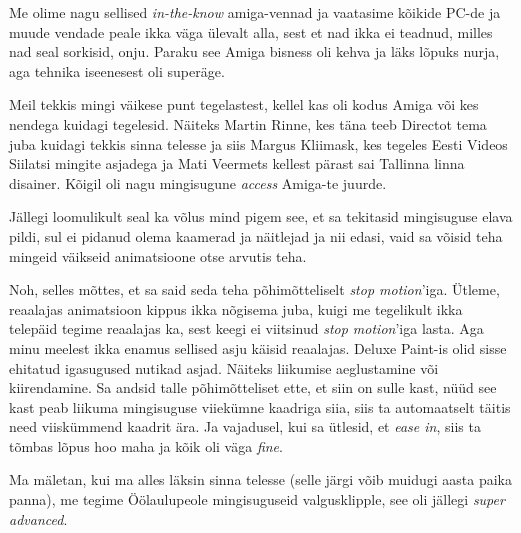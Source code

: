 Me olime nagu sellised \emph{in-the-know} amiga-vennad ja vaatasime  kõikide PC-de  ja muude vendade peale ikka väga ülevalt alla, sest et nad ikka ei teadnud, milles nad seal sorkisid, onju. Paraku see Amiga bisness oli kehva ja läks lõpuks nurja, aga tehnika iseenesest oli superäge. 

Meil tekkis mingi väikese punt tegelastest, kellel kas oli kodus Amiga või kes nendega kuidagi tegelesid. Näiteks Martin Rinne, kes täna teeb Directot tema juba kuidagi tekkis  sinna telesse ja siis Margus Kliimask, kes tegeles Eesti Videos Siilatsi mingite asjadega ja Mati Veermets kellest pärast sai Tallinna linna disainer.  Kõigil oli nagu mingisugune \emph{access} Amiga-te juurde. 

Jällegi loomulikult seal ka võlus mind pigem see, et sa tekitasid mingisuguse elava pildi, sul ei  pidanud olema kaamerad ja näitlejad ja nii edasi, vaid sa võisid teha mingeid väikseid animatsioone otse arvutis teha.


Noh, selles mõttes, et sa said seda teha põhimõtteliselt \emph{stop motion}'iga. Ütleme,  reaalajas animatsioon kippus ikka nõgisema juba, kuigi me tegelikult ikka telepäid tegime reaalajas ka, sest keegi ei viitsinud \emph{stop motion}'iga lasta. Aga minu meelest ikka enamus sellised asju käisid reaalajas. Deluxe Paint-is olid sisse ehitatud igasugused nutikad asjad. Näiteks  liikumise aeglustamine või kiirendamine. Sa andsid talle põhimõtteliset ette, et siin on sulle kast, nüüd see kast peab liikuma mingisuguse viiekümne kaadriga siia, siis ta automaatselt täitis need viiskümmend kaadrit ära. Ja vajadusel, kui sa ütlesid, et \emph{ease in}, siis ta tõmbas lõpus hoo maha ja kõik oli väga \emph{fine}.  

Ma mäletan, kui ma alles läksin sinna telesse (selle järgi võib muidugi aasta paika panna), me tegime Öölaulupeole  mingisuguseid valgusklipple, see oli jällegi \emph{super advanced}.


